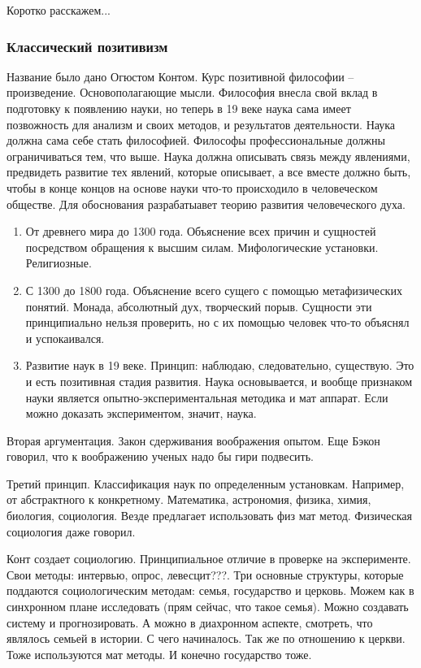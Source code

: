 \documentclass[a4paper, 12pt]{article}
\begin{document}
Коротко расскажем...

\subsubsection{Классический позитивизм}

Название было дано Огюстом Контом. Курс позитивной философии -- 
произведение. Основополагающие мысли. Философия внесла свой вклад 
в подготовку к появлению науки, но теперь в 19 веке наука сама имеет 
позвожность для анализм и своих методов, и результатов деятельности. 
Наука должна сама себе стать философией. Философы профессиональные 
должны ограничиваться тем, что выше. Наука должна описывать связь между 
явлениями, предвидеть развитие тех явлений, которые описывает, а все 
вместе должно быть, чтобы в конце концов на основе науки что-то 
происходило в человеческом обществе. Для обоснования разрабатыавет 
теорию развития человеческого духа.
\begin{enumerate}
  \item От древнего мира до 1300 года. Объяснение всех причин 
    и сущностей посредством обращения к высшим силам. Мифологические 
    установки. Религиозные.
  \item С 1300 до 1800 года. Объяснение всего сущего с помощью 
    метафизических понятий. Монада, абсолютный дух, творческий порыв. 
    Сущности эти принципиально нельзя проверить, но с их помощью человек 
    что-то объяснял и успокаивался.
  \item Развитие наук в 19 веке. Принцип: наблюдаю, следовательно, 
    существую. Это и есть позитивная стадия развития. Наука 
    основывается, и вообще признаком науки является 
    опытно-экспериментальная методика и мат аппарат. Если можно доказать 
    экспериментом, значит, наука.
\end{enumerate}

Вторая аргументация. Закон сдерживания воображения опытом. Еще Бэкон 
говорил, что к воображению ученых надо бы гири подвесить.

Третий принцип. Классификация наук по определенным установкам. Например, 
от абстрактного к конкретному. Математика, астрономия, физика, химия, 
биология, социология. Везде предлагает использовать физ мат метод. 
Физическая социология даже говорил.

Конт создает социологию. Принципиальное отличие в проверке на 
эксперименте. Свои методы: интервью, опрос, левесцит???. Три основные 
структуры, которые поддаются социологическим методам: семья, государство 
и церковь. Можем как в синхронном плане исследовать (прям сейчас, что 
такое семья). Можно создавать систему и прогнозировать. А можно 
в диахронном аспекте, смотреть, что являлось семьей в истории. С чего 
начиналось. Так же по отношению к церкви. Тоже используются мат методы. 
И конечно государство тоже.
\end{document}
